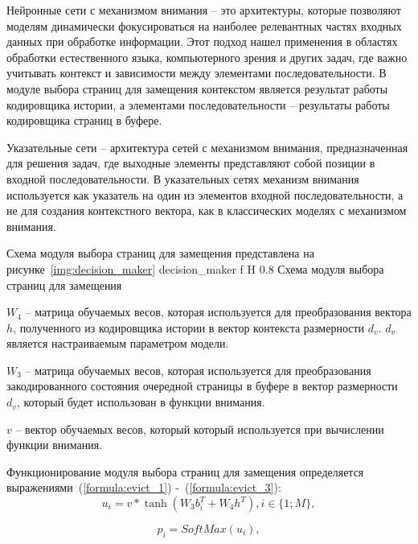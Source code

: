 Нейронные сети с механизмом внимания -- это архитектуры, которые позволяют моделям динамически фокусироваться на наиболее релевантных частях входных данных при обработке информации.
Этот подход нашел применения в областях обработки естественного языка, компьютерного зрения и других задач, где важно учитывать контекст и зависимости между элементами последовательности.
В модуле выбора страниц для замещения контекстом является результат работы кодировщика истории, а элементами последовательности -- результаты работы кодировщика страниц в буфере.

Указательные сети -- архитектура сетей с механизмом внимания, предназначенная для решения задач, где выходные элементы представляют собой позиции в входной последовательности.
В указательных сетях механизм внимания используется как указатель на один из элементов входной последовательности, а не для создания контекстного вектора, как в классических моделях с механизмом внимания.

Схема модуля выбора страниц для замещения представлена на рисунке~\ref{img:decision_maker}
{decision_maker} %
{f} %
{H} %
{0.8\textwidth} %
{Схема модуля выбора страниц для замещения} %

$W_4$ -- матрица обучаемых весов, которая используется для преобразования вектора $h$, полученного из кодировщика истории в вектор контекста размерности $d_v$. $d_v$ является настраиваемым параметром модели.

$W_3$ -- матрица обучаемых весов, которая используется для преобразования закодированного состояния очередной страницы в буфере в вектор размерности $d_v$, который будет использован в функции внимания.

$v$ -- вектор обучаемых весов, который который используется при вычислении функции внимания.

Функционирование модуля выбора страниц для замещения определяется выражениями~(\ref{formula:evict_1}) -~(\ref{formula:evict_3}):
\begin{equation}\label{formula:evict_1}
	u_i = v * \tanh(W_3 b_i^T + W_4 h^T), i \in \{1; M\},
\end{equation}

\begin{equation}\label{formula:evict_2}
	p_i = SoftMax(u_i),
\end{equation}

